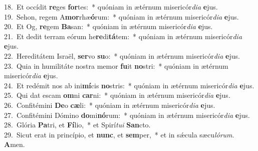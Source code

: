 {18.~}Et occídit \textbf{re}ges \textbf{for}tes:~* quóniam in ætérnum misericór\textit{di}\textit{a} \textbf{e}jus.\\
{19.~}Sehon, regem A\textbf{mor}rhæ\textbf{ó}rum:~* quóniam in ætérnum misericór\textit{di}\textit{a} \textbf{e}jus.\\
{20.~}Et Og, \textbf{re}gem \textbf{Ba}san:~* quóniam in ætérnum misericór\textit{di}\textit{a} \textbf{e}jus.\\
{21.~}Et dedit terram eórum he\textbf{re}di\textbf{tá}tem:~* quóniam in ætérnum misericór\textit{di}\textit{a} \textbf{e}jus.\\
{22.~}Hereditátem Israël, \textbf{ser}vo \textbf{su}o:~* quóniam in ætérnum misericór\textit{di}\textit{a} \textbf{e}jus.\\
{23.~}Quia in humilitáte nostra memor \textbf{fu}it \textbf{no}stri:~* quóniam in ætérnum misericór\textit{di}\textit{a} \textbf{e}jus.\\
{24.~}Et redémit nos ab ini\textbf{mí}cis \textbf{no}stris:~* quóniam in ætérnum misericór\textit{di}\textit{a} \textbf{e}jus.\\
{25.~}Qui dat escam \textbf{om}ni \textbf{car}ni:~* quóniam in ætérnum misericór\textit{di}\textit{a} \textbf{e}jus.\\
{26.~}Confitémini \textbf{De}o \textbf{cæ}li:~* quóniam in ætérnum misericór\textit{di}\textit{a} \textbf{e}jus.\\
{27.~}Confitémini Dómino \textbf{do}mi\textbf{nó}rum:~* quóniam in ætérnum misericór\textit{di}\textit{a} \textbf{e}jus.\\
{28.~}Glória \textbf{Pa}tri, et \textbf{Fí}lio,~* et Spirí\textit{tu}\textit{i} \textbf{San}cto.\\
{29.~}Sicut erat in princípio, et \textbf{nunc}, et \textbf{sem}per,~* et in sǽcula sæcu\textit{ló}\textit{rum}. \textbf{A}men.\\
